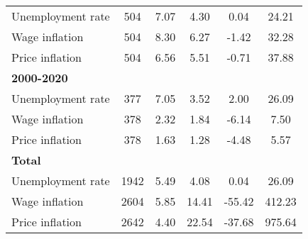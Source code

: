 \begin{table}[!h]
\begin{tabular}{l*{1}{ccccc}}
Unemployment rate   &         504&        7.07&        4.30&        0.04&       24.21\\
Wage inflation      &         504&        8.30&        6.27&       -1.42&       32.28\\
Price inflation     &         504&        6.56&        5.51&       -0.71&       37.88\\
\hline
\textbf{2000-2020}           &            &            &            &            &            \\
Unemployment rate   &         377&        7.05&        3.52&        2.00&       26.09\\
Wage inflation      &         378&        2.32&        1.84&       -6.14&        7.50\\
Price inflation     &         378&        1.63&        1.28&       -4.48&        5.57\\
\hline
\textbf{Total}               &            &            &            &            &            \\
Unemployment rate   &        1942&        5.49&        4.08&        0.04&       26.09\\
Wage inflation      &        2604&        5.85&       14.41&      -55.42&      412.23\\
Price inflation     &        2642&        4.40&       22.54&      -37.68&      975.64\\
\hline\hline
\end{tabular}
\end{table}